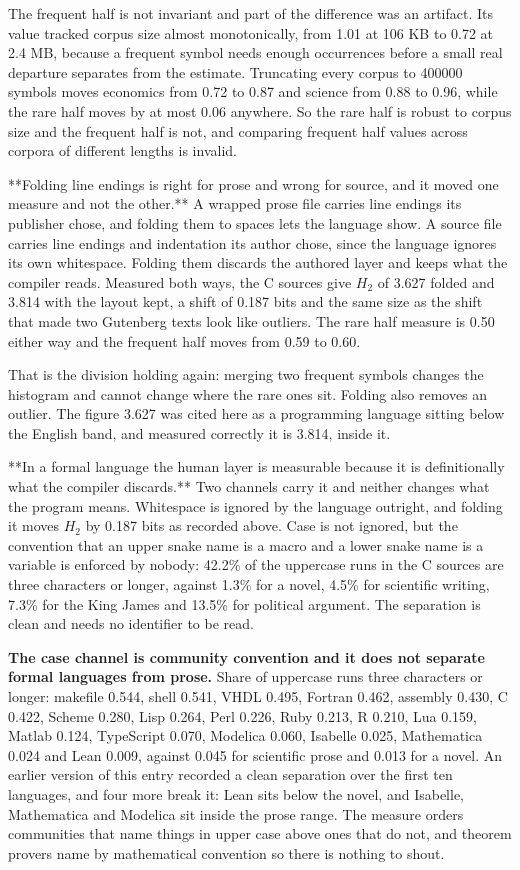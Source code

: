 The frequent half is not invariant and part of the difference was an artifact. Its value tracked corpus size almost monotonically, from 1.01 at 106 KB to 0.72 at 2.4 MB, because a frequent symbol needs enough occurrences before a small real departure separates from the estimate. Truncating every corpus to 400000 symbols moves economics from 0.72 to 0.87 and science from 0.88 to 0.96, while the rare half moves by at most 0.06 anywhere. So the rare half is robust to corpus size and the frequent half is not, and comparing frequent half values across corpora of different lengths is invalid.

**Folding line endings is right for prose and wrong for source, and it moved one measure and not the other.** A wrapped prose file carries line endings its publisher chose, and folding them to spaces lets the language show. A source file carries line endings and indentation its author chose, since the language ignores its own whitespace. Folding them discards the authored layer and keeps what the compiler reads. Measured both ways, the C sources give \(H_2\) of 3.627 folded and 3.814 with the layout kept, a shift of 0.187 bits and the same size as the shift that made two Gutenberg texts look like outliers. The rare half measure is 0.50 either way and the frequent half moves from 0.59 to 0.60.

That is the division holding again: merging two frequent symbols changes the histogram and cannot change where the rare ones sit. Folding also removes an outlier. The figure 3.627 was cited here as a programming language sitting below the English band, and measured correctly it is 3.814, inside it.

**In a formal language the human layer is measurable because it is definitionally what the compiler discards.** Two channels carry it and neither changes what the program means. Whitespace is ignored by the language outright, and folding it moves \(H_2\) by 0.187 bits as recorded above. Case is not ignored, but the convention that an upper snake name is a macro and a lower snake name is a variable is enforced by nobody: 42.2\% of the uppercase runs in the C sources are three characters or longer, against 1.3\% for a novel, 4.5\% for scientific writing, 7.3\% for the King James and 13.5\% for political argument. The separation is clean and needs no identifier to be read.

\textbf{The case channel is community convention and it does not separate formal languages from prose.} Share of uppercase runs three characters or longer: makefile 0.544, shell 0.541, VHDL 0.495, Fortran 0.462, assembly 0.430, C 0.422, Scheme 0.280, Lisp 0.264, Perl 0.226, Ruby 0.213, R 0.210, Lua 0.159, Matlab 0.124, TypeScript 0.070, Modelica 0.060, Isabelle 0.025, Mathematica 0.024 and Lean 0.009, against 0.045 for scientific prose and 0.013 for a novel. An earlier version of this entry recorded a clean separation over the first ten languages, and four more break it: Lean sits below the novel, and Isabelle, Mathematica and Modelica sit inside the prose range. The measure orders communities that name things in upper case above ones that do not, and theorem provers name by mathematical convention so there is nothing to shout.

